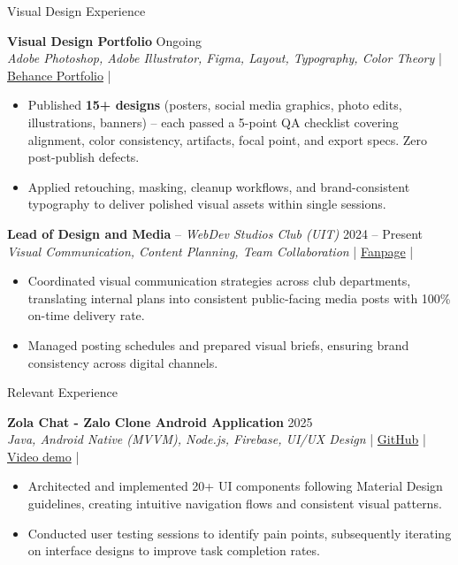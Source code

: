\documentclass{resume}
\begin{document}
\begin{rSection}{Visual Design Experience}
    \vspace{-0.5em}
    
    \item \textbf{Visual Design Portfolio} \hfill Ongoing\\
    {\small \textit{Adobe Photoshop, Adobe Illustrator, Figma, Layout, Typography, Color Theory}} \hfill | \href{https://www.behance.net/kienphan13}{Behance Portfolio} |
    \begin{itemize}
        \itemsep -3pt {}
        \item Published \textbf{15+ designs} (posters, social media graphics, photo edits, illustrations, banners) -- each passed a 5-point QA checklist covering alignment, color consistency, artifacts, focal point, and export specs. Zero post-publish defects.
        \item Applied retouching, masking, cleanup workflows, and brand-consistent typography to deliver polished visual assets within single sessions.
    \end{itemize}

    \item \textbf{Lead of Design and Media} -- \textit{WebDev Studios Club (UIT)} \hfill 2024 -- Present\\
    {\small \textit{Visual Communication, Content Planning, Team Collaboration}} \hfill | \href{https://www.facebook.com/webdevstudios.org}{Fanpage} |
    \begin{itemize}
        \itemsep -3pt {}
        \item Coordinated visual communication strategies across club departments, translating internal plans into consistent public-facing media posts with 100\% on-time delivery rate.
        \item Managed posting schedules and prepared visual briefs, ensuring brand consistency across digital channels.
    \end{itemize}

\end{rSection}

\begin{rSection}{Relevant Experience}
    \vspace{-0.5em}

    \item \textbf{Zola Chat - Zalo Clone Android Application} \hfill 2025\\
    {\small \textit{Java, Android Native (MVVM), Node.js, Firebase, UI/UX Design}} \hfill | \href{https://github.com/pckienuit/DoAn_ZaloClone}{GitHub} | \href{https://youtu.be/M8V_0-b_fXk?si=uKJ-JLFAkGMLodZN}{Video demo} |
    \begin{itemize}
        \itemsep -3pt {}
        \item Architected and implemented 20+ UI components following Material Design guidelines, creating intuitive navigation flows and consistent visual patterns.
        \item Conducted user testing sessions to identify pain points, subsequently iterating on interface designs to improve task completion rates.
    \end{itemize}
\end{rSection}
\end{document}
